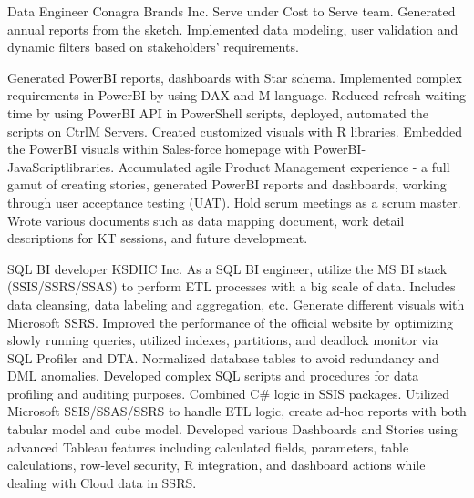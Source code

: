 \documentclass[a4paper]{ReadableCV}
\begin{document}
{Data Engineer}
{Conagra Brands Inc.}
{Serve under Cost to Serve team. Generated annual reports from the sketch.  Implemented data modeling, user validation and dynamic filters based on stakeholders' requirements.}

{Generated PowerBI reports, dashboards with Star schema. Implemented complex requirements in PowerBI by using DAX and M language.}
{Reduced refresh waiting time by using PowerBI API in PowerShell scripts, deployed, automated the scripts on CtrlM Servers.}
{Created customized visuals with R libraries. Embedded the PowerBI visuals within Sales-force homepage with PowerBI-JavaScriptlibraries.}
{Accumulated agile Product Management experience - a full gamut of creating stories, generated PowerBI reports and dashboards, working through user acceptance testing (UAT).}
{Hold scrum meetings as a scrum master. Wrote various documents such as data mapping document, work detail descriptions for KT sessions, and future development.}

{SQL BI developer}
{KSDHC Inc.}
{As a SQL BI engineer, utilize the MS BI stack (SSIS/SSRS/SSAS) to perform ETL processes with a big scale of data. Includes data cleansing, data labeling and aggregation, etc. Generate different visuals with Microsoft SSRS.}
{Improved the performance of the official website by optimizing slowly running queries, utilized indexes, partitions, and deadlock monitor via SQL Profiler and DTA.}
{Normalized database tables to avoid redundancy and DML anomalies.}
{Developed complex SQL scripts and procedures for data profiling and auditing purposes. Combined C\# logic in SSIS packages.}
{Utilized Microsoft SSIS/SSAS/SSRS to handle ETL logic, create ad-hoc reports with both tabular model and cube model.}
{Developed various Dashboards and Stories using advanced Tableau features including calculated fields, parameters, table
	calculations, row-level security, R integration, and dashboard actions while dealing with Cloud data in SSRS.}


\end{document}
